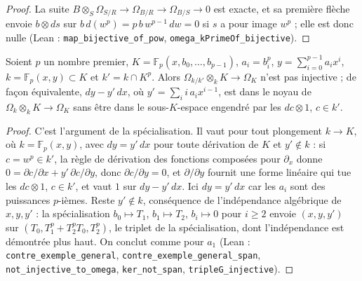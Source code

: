 \begin{proof}
La suite $B \otimes_S \Omega_{S/R} \to \Omega_{B/R} \to \Omega_{B/S} \to 0$ est exacte, et sa première flèche envoie $b \otimes ds$ sur $b\, d(w^p) = p\, b\, w^{p-1}\, dw = 0$ si $s$ a pour image $w^p$ ; elle est donc nulle (Lean : \texttt{map\_bijective\_of\_pow}, \texttt{omega\_kPrimeOf\_bijective}).
\end{proof}

\begin{encadre}
\begin{contrexemple}\label{thm:22-differentielles-general}
Soient $p$ un nombre premier, $K = \mathbb F_p(x, b_0, \ldots, b_{p-1})$, $a_i = b_i^p$, $y = \sum_{i=0}^{p-1} a_i x^i$, $k = \mathbb F_p(x, y) \subset K$ et $k' = k \cap K^p$. Alors $\Omega_{k/k'} \otimes_k K \to \Omega_K$ n'est pas injective ; de façon équivalente, $dy - y'\,dx$, où $y' = \sum_i i\, a_i x^{i-1}$, est dans le noyau de $\Omega_k \otimes_k K \to \Omega_K$ sans être dans le sous-$K$-espace engendré par les $dc \otimes 1$, $c \in k'$.
\end{contrexemple}
\end{encadre}

\begin{proof}
C'est l'argument de la spécialisation. Il vaut pour tout plongement $k \to K$, où $k = \mathbb F_p(x, y)$, avec $dy = y'\,dx$ pour toute dérivation de $K$ et $y' \notin k$ : si $c = w^p \in k'$, la règle de dérivation des fonctions composées pour $\partial_x$ donne $0 = \partial c/\partial x + y'\, \partial c/\partial y$, donc $\partial c/\partial y = 0$, et $\partial/\partial y$ fournit une forme linéaire qui tue les $dc \otimes 1$, $c \in k'$, et vaut $1$ sur $dy - y'\,dx$. Ici $dy = y'\,dx$ car les $a_i$ sont des puissances $p$-ièmes. Reste $y' \notin k$, conséquence de l'indépendance algébrique de $x, y, y'$ : la spécialisation $b_0 \mapsto T_1$, $b_1 \mapsto T_2$, $b_i \mapsto 0$ pour $i \geq 2$ envoie $(x, y, y')$ sur $(T_0, T_1^p + T_2^p T_0, T_2^p)$, le triplet de la spécialisation, dont l'indépendance est démontrée plus haut. On conclut comme pour $a_1$ (Lean : \texttt{contre\_exemple\_general}, \texttt{contre\_exemple\_general\_span}, \texttt{not\_injective\_to\_omega}, \texttt{ker\_not\_span}, \texttt{tripleG\_injective}).
\end{proof}

